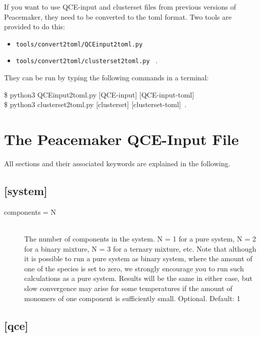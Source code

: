 \documentclass{scrartcl}
\begin{document}
If you want to use QCE-input and clusterset files from previous versions of Peacemaker, they need
to be converted to the toml format.
Two tools are provided to do this:
\begin{itemize}[noitemsep]
    \item \texttt{tools/convert2toml/QCEinput2toml.py} 
    \item \texttt{tools/convert2toml/clusterset2toml.py} ~.
\end{itemize}
They can be run by typing the following commands in a terminal:
\begin{addmargin}[1cm]{0cm}
    \ttfamily
    \$ python3 QCEinput2toml.py [QCE-input] [QCE-input-toml] \\
    \$ python3 clusterset2toml.py [clusterset] [clusterset-toml]~.
\end{addmargin}

\newpage
\section{The Peacemaker QCE-Input File}
\label{sec:input}

All sections and their associated keywords are explained in the following.

\subsection*{[system]}
\vspace{-0.3cm}

\begin{description}
    \item[components = N] \hfill \\
        The number of components in the system.
        N = 1 for a pure system, N = 2 for a binary mixture, N = 3 for a ternary mixture, etc.
        Note that although it is possible to run a pure system as binary system, where the amount of 
        one of the species is set to zero, we strongly encourage you to run such calculations as a pure system.
        Results will be the same in either case, but slow convergence may arise for some temperatures 
        if the amount of monomers of one component is sufficiently small.
        Optional. Default: 1
\end{description}

\subsection*{[qce]}
\vspace{-0.3cm}
\end{document}
